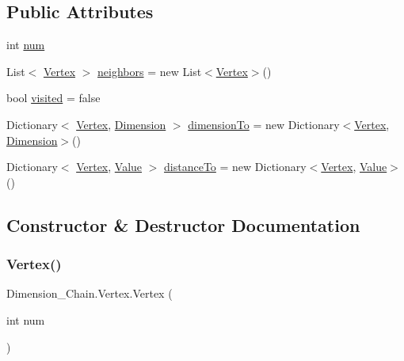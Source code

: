 \subsection*{Public Attributes}
\begin{DoxyCompactItemize}
\item 
int \mbox{\hyperlink{class_dimension___chain_1_1_vertex_aa803e8c5e381e30ad498686633a3a4ae}{num}}
\item 
List$<$ \mbox{\hyperlink{class_dimension___chain_1_1_vertex}{Vertex}} $>$ \mbox{\hyperlink{class_dimension___chain_1_1_vertex_a88374fb71c7e0c494307b501cf1cd3bd}{neighbors}} = new List$<$\mbox{\hyperlink{class_dimension___chain_1_1_vertex}{Vertex}}$>$()
\item 
bool \mbox{\hyperlink{class_dimension___chain_1_1_vertex_af2e30f955bb2d8cba8f8c4846ecc767d}{visited}} = false
\item 
Dictionary$<$ \mbox{\hyperlink{class_dimension___chain_1_1_vertex}{Vertex}}, \mbox{\hyperlink{class_dimension___chain_1_1_dimension}{Dimension}} $>$ \mbox{\hyperlink{class_dimension___chain_1_1_vertex_af26ff58e451fc5b0777e08a2fb849800}{dimension\+To}} = new Dictionary$<$\mbox{\hyperlink{class_dimension___chain_1_1_vertex}{Vertex}}, \mbox{\hyperlink{class_dimension___chain_1_1_dimension}{Dimension}}$>$()
\item 
Dictionary$<$ \mbox{\hyperlink{class_dimension___chain_1_1_vertex}{Vertex}}, \mbox{\hyperlink{class_dimension___chain_1_1_value}{Value}} $>$ \mbox{\hyperlink{class_dimension___chain_1_1_vertex_a4143488432955c4f229b0329ab8cd6e1}{distance\+To}} = new Dictionary$<$\mbox{\hyperlink{class_dimension___chain_1_1_vertex}{Vertex}}, \mbox{\hyperlink{class_dimension___chain_1_1_value}{Value}}$>$()
\end{DoxyCompactItemize}


\subsection{Constructor \& Destructor Documentation}
\mbox{\label{class_dimension___chain_1_1_vertex_a57ae2d0098e07307070c4e140980527c}} 
\subsubsection{\texorpdfstring{Vertex()}{Vertex()}}
{\footnotesize\ttfamily Dimension\+\_\+\+Chain.\+Vertex.\+Vertex (\begin{DoxyParamCaption}\item[{int}]{num }\end{DoxyParamCaption})}



